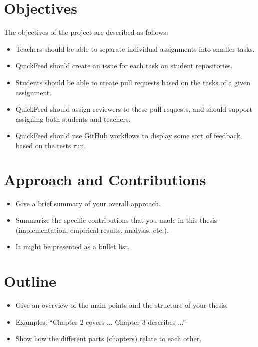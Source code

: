 \section{Objectives}

The objectives of the project are described as follows:
\begin{itemize}
    \item Teachers should be able to separate individual assignments into smaller tasks.
    \item QuickFeed should create an issue for each task on student repositories.
    \item Students should be able to create pull requests based on the tasks of a given assignment.
    \item QuickFeed should assign reviewers to these pull requests, and should support assigning both students and teachers.
    \item QuickFeed should use GitHub workflows to display some sort of feedback, based on the tests run.
\end{itemize}

\section{Approach and Contributions}

\begin{itemize}
\item Give a brief summary of your overall approach.
\item Summarize the specific contributions that you made in this thesis (implementation, empirical results, analysis, etc.).
\item It might be presented as a bullet list.
\end{itemize}


\section{Outline}

\begin{itemize}
\item Give an overview of the main points and the structure of your thesis.
\item Examples: ``Chapter 2 covers ...  Chapter 3 describes ...''
\item Show how the different parts (chapters) relate to each other.
\end{itemize}
